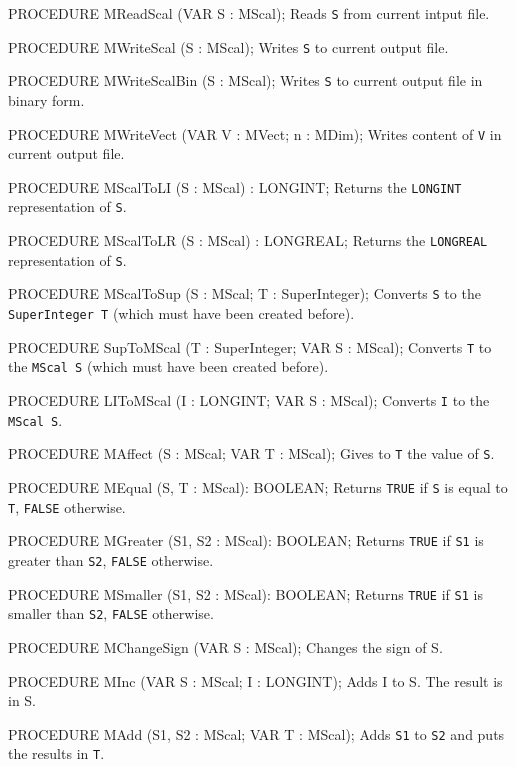 PROCEDURE MReadScal (VAR S : MScal);
\endcode
  \tab  Reads {\tt S} from current intput file.
  \endtab
\code

PROCEDURE MWriteScal (S : MScal);
\endcode
  \tab  Writes {\tt S} to current output file.
  \endtab
\code

PROCEDURE MWriteScalBin (S : MScal);
\endcode
  \tab  Writes {\tt S} to current output file in binary form.
  \endtab
\code

PROCEDURE MWriteVect (VAR V : MVect;  n : MDim);
\endcode
  \tab  Writes content of {\tt V} in current output file.
  \endtab
\code

PROCEDURE MScalToLI (S : MScal) : LONGINT;
\endcode
  \tab  Returns the {\tt LONGINT} representation of {\tt S}.\endtab
\code

PROCEDURE MScalToLR (S : MScal) : LONGREAL;
\endcode
  \tab  Returns the {\tt LONGREAL} representation of {\tt S}.\endtab
\code

PROCEDURE MScalToSup (S : MScal;  T : SuperInteger);
\endcode
  \tab  Converts {\tt S} to the {\tt SuperInteger T} (which must have been
   created before).\endtab
\code

PROCEDURE SupToMScal (T : SuperInteger;  VAR S : MScal);
\endcode
  \tab  Converts {\tt T} to the {\tt MScal S} (which must have been
   created before).\endtab
\code

PROCEDURE LIToMScal (I : LONGINT;  VAR S : MScal);
\endcode
  \tab  Converts {\tt I} to the {\tt MScal S}.\endtab
\code

PROCEDURE MAffect (S : MScal;  VAR T : MScal);
\endcode
  \tab  Gives to {\tt T} the value of {\tt S}. \endtab
\code

PROCEDURE MEqual (S, T : MScal): BOOLEAN;
\endcode
  \tab  Returns {\tt TRUE} if {\tt S} is equal to {\tt T},
  {\tt FALSE} otherwise.
  \endtab
\code

PROCEDURE MGreater (S1, S2 : MScal): BOOLEAN;
\endcode
  \tab  Returns {\tt TRUE} if {\tt S1} is greater than {\tt S2},
  {\tt FALSE} otherwise.
  \endtab
\code

PROCEDURE MSmaller (S1, S2 : MScal): BOOLEAN;
\endcode
  \tab  Returns {\tt TRUE} if {\tt S1} is smaller than {\tt S2},
  {\tt FALSE} otherwise.
  \endtab
\code

PROCEDURE MChangeSign (VAR S : MScal);
\endcode
  \tab  Changes the sign of S. \endtab
\code

PROCEDURE MInc (VAR S : MScal; I : LONGINT);
\endcode
  \tab  Adds I to S.  The result is in S.  \endtab
\code

PROCEDURE MAdd (S1, S2 : MScal;   VAR T : MScal);
\endcode
  \tab  Adds {\tt S1} to {\tt S2} and puts the results in {\tt T}.\endtab
\code

